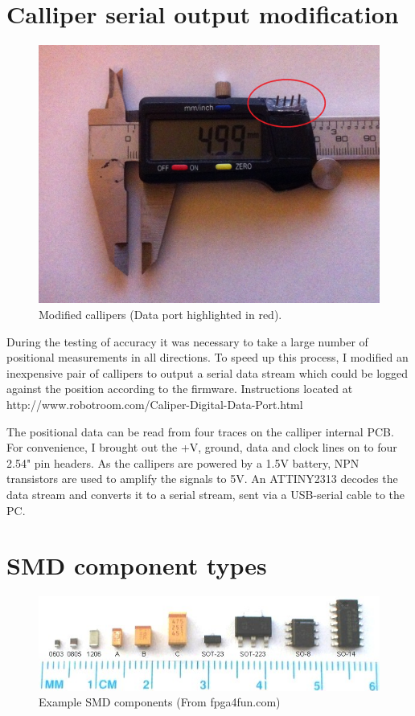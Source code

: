 \documentclass[a4paper,11pt]{article}  %
\begin{document}
\newpage
\section{Calliper serial output modification}

\begin{figure}[ht!]
\centering
\includegraphics[width=150mm]{resources/callipermod.jpg}
\caption{Modified callipers (Data port highlighted in red).}
\label{overflow}
\end{figure}

During the testing of accuracy it was necessary to take a large number of positional measurements in all directions. 
To speed up this process, I modified an inexpensive pair of callipers to output a serial data stream which could be logged
against the position according to the firmware. Instructions located at http://www.robotroom.com/Caliper-Digital-Data-Port.html

The positional data can be read from four traces on the calliper internal PCB. For convenience, I brought out the +V, ground, data and clock lines
on to four 2.54" pin headers. As the callipers are powered by a 1.5V battery, NPN transistors are used to amplify the signals to 5V. An ATTINY2313
decodes the data stream and converts it to a serial stream, sent via a USB-serial cable to the PC.

\newpage
\section{SMD component types}

\begin{figure}[ht!]
\centering
\includegraphics[width=150mm]{resources/SMDsizes.jpg}
\caption{Example SMD components (From fpga4fun.com)}
\label{overflow}
\end{figure}
\end{document}
